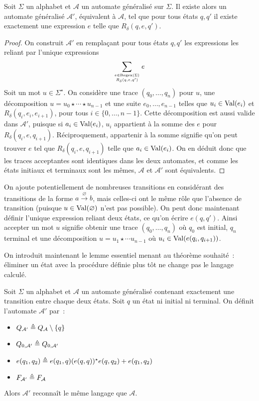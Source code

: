 \begin{proposition}
  Soit $\Sigma$ un alphabet et $\mathcal A$ un automate généralisé sur $\Sigma$.
  Il existe alors un automate généralisé $\mathcal A'$, équivalent à
  $\mathcal A$, tel que pour tous états $q,q'$ il existe exactement une
  expression $e$ telle que $R_\delta(q,e,q')$.
\end{proposition}

\begin{proof}
  On construit $\mathcal A'$ en remplaçant pour tous états $q,q'$ les
  expressions les reliant par l'unique expressions
  \[\sum_{e \in \operatorname{Regex}(\Sigma)\atop{R_\delta(q,e,q')}} e\]
  Soit un mot $u\in \Sigma^\star$. On considère une trace $(q_0,\ldots,q_n)$
  pour $u$, une décomposition $u = u_0\star\cdots\star u_{n-1}$ et une suite
  $e_0,\ldots, e_{n-1}$ telles que $u_i \in \operatorname{Val}(e_i)$ et
  $R_\delta(q_i,e_i,e_{i+1})$, pour tous $i \in \{0,\ldots,n-1\}$.
  Cette décomposition est aussi valide dans $\mathcal A'$, puisque si
  $a_i \in \operatorname{Val}(e_i)$, $u_i$ appartient à la somme des $e$ pour
  $R_\delta(q_i,e,q_{i+1})$. Réciproquement, appartenir à la somme signifie qu'on
  peut trouver $e$ tel que $R_\delta(q_i,e,q_{i+1})$ telle que
  $a_i \in \operatorname{Val}(e_i)$. On en déduit donc que les traces acceptantes sont
  identiques dans les deux automates, et comme les états initiaux et terminaux
  sont les mêmes, $\mathcal A$ et $\mathcal A'$ sont équivalents.
\end{proof}

\begin{remark}
  On ajoute potentiellement de nombreuses transitions en considérant des
  transitions de la forme $a\xrightarrow \varnothing b$, mais celles-ci ont le
  même rôle que l'absence de transition (puisque $u \in \operatorname{Val}(\varnothing)$ n'est
  pas possible). On peut donc maintenant définir l'unique expression reliant
  deux états, ce qu'on écrire $e(q,q')$. Ainsi accepter un mot $u$ signifie
  obtenir une trace $(q_0,\ldots,q_n)$ où $q_0$ est initial, $q_n$ terminal et
  une décomposition $u = u_1\star \cdots u_{n-1}$ où
  $u_i \in \operatorname{Val}(e(q_i,q_{i+1}))$.
\end{remark}

On introduit maintenant le lemme essentiel menant au théorème souhaité~:
éliminer un état avec la procédure définie plus tôt ne change pas le langage
calculé.

\begin{lemma}\label{lem.elim.state}
  Soit $\Sigma$ un alphabet et $\mathcal A$ un automate généralisé contenant
  exactement une transition entre chaque deux états. Soit $q$ un état ni initial
  ni terminal. On définit l'automate $\mathcal A'$ par~:
  \begin{itemize}
  \item $Q_{\mathcal A'} \triangleq Q_{\mathcal A} \setminus \{q\}$
  \item $Q_{0,\mathcal A'} \triangleq Q_{0,\mathcal A'}$
  \item $e(q_1,q_2) \triangleq e(q_1,q) (e(q,q))^\star e(q,q_2) + e(q_1,q_2)$
  \item $F_{\mathcal A'} \triangleq F_{\mathcal A}$
  \end{itemize}
  Alors $\mathcal A'$ reconnaît le même langage que $\mathcal A$.
\end{lemma}

